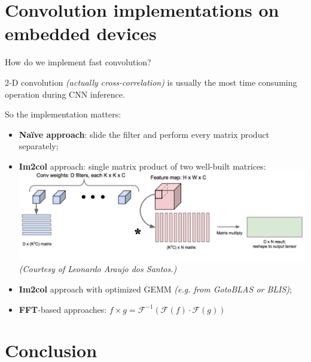 \documentclass{beamer}
\begin{document}
\section{Convolution implementations on embedded devices}

\begin{frame}{How do we implement fast convolution?}
\small
\begin{block}{}
    2-D convolution \textit{(actually cross-correlation)} is usually the most time consuming operation during CNN inference.
\end{block}

\bigskip
\footnotesize
{}
So the implementation matters:
\begin{itemize}
    \item \textbf{Naïve approach}: slide the filter and perform every matrix product separately;
    \item \textbf{Im2col} approach: single matrix product of two well-built matrices:\\
    \includegraphics[width=.8\textwidth]{im2col.png}\\
    \textit{(Courtesy of Leonardo Araujo dos Santos.)}
    \item \textbf{Im2col} approach with optimized GEMM \textit{(e.g. from GotoBLAS or BLIS)};
    \item \textbf{FFT}-based approaches: $f \times g = \mathcal{F}^{-1}\left(\mathcal{F}(f) \cdot \mathcal{F}(g)\right)$
\end{itemize}

\end{frame}

\section{Conclusion}
\end{document}
